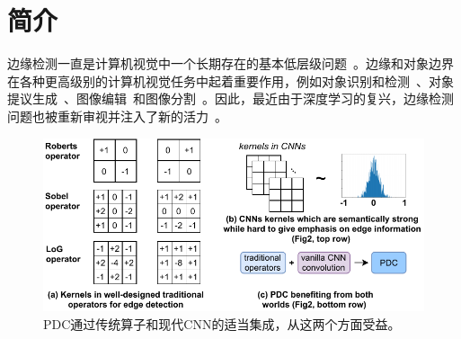 \documentclass[10pt,twocolumn,letterpaper]{article}
\begin{document}
\section{简介}
\label{sec:intro}


边缘检测一直是计算机视觉中一个长期存在的基本低层级问题~\cite{canny1986computational}。边缘和对象边界在各种更高级别的计算机视觉任务中起着重要作用，例如对象识别和检测~\cite{liu2020deep, ferrari2007groups}、对象提议生成~\cite{cheng2014bing, uijlings2013selective}、图像编辑~\cite{elder1998imageediting}和图像分割~\cite{muthukrishnan2011edgeimageseg, bertasius2016semantic}。因此，最近由于深度学习的复兴，边缘检测问题也被重新审视并注入了新的活力~\cite{bertasius2015deepedge, kokkinos2015deepboundary, shen2015deepcontour, xie2017holistically, wang2017ced, liu2019richer}。


\begin{figure}[t!]
    \centering
    \includegraphics[width=0.98\linewidth]{images/fig1_rebuttal.pdf}
    \caption{PDC通过传统算子和现代CNN的适当集成，从这两个方面受益。}
    \label{fig:figure1}
\end{figure}
\end{document}
